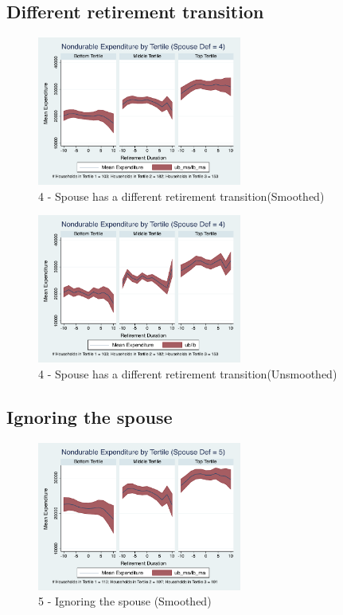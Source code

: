 \documentclass[11pt]{article}
\begin{document}
\subsection{Different retirement transition}
\begin{figure}[h]
	\caption{4 - Spouse has a different retirement transition(Smoothed)}
	\centering
	\includegraphics[width=0.6\textwidth]{../ConsumptionPostRetirement_by_SpouseDef/Smoothed/spouse_def_4.pdf}
\end{figure}

\begin{figure}[h]
	\caption{4 - Spouse has a different retirement transition(Unsmoothed)}
	\centering
	\includegraphics[width=0.6\textwidth]{../ConsumptionPostRetirement_by_SpouseDef/UnSmoothed/spouse_def_4.pdf}
\end{figure}
\clearpage


\subsection{Ignoring the spouse}

\begin{figure}[h]
	\caption{5 - Ignoring the spouse (Smoothed)}
	\centering
	\includegraphics[width=0.6\textwidth]{../ConsumptionPostRetirement_by_SpouseDef/Smoothed/spouse_def_5.pdf}
\end{figure}
\end{document}
